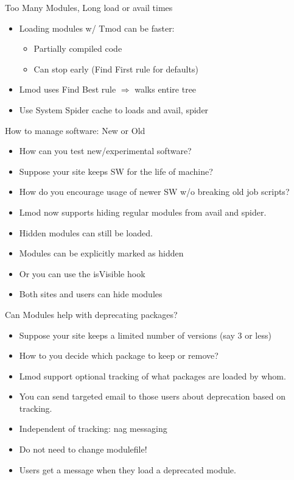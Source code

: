\documentclass{beamer}
\begin{document}
\begin{frame}{Too Many Modules, Long load or avail times}
  \begin{itemize}
    \item Loading modules w/ Tmod can be faster:
      \begin{itemize}
        \item Partially compiled code
        \item Can stop early (Find First rule for defaults)
      \end{itemize}
    \item Lmod uses Find Best rule $\Rightarrow$ walks entire tree
    \item Use System Spider cache to loads and avail, spider
  \end{itemize}
\end{frame}

\begin{frame}{How to manage software: New or Old}
  \begin{itemize}
    \item How can you test new/experimental software?
    \item Suppose your site keeps SW for the life of machine?
    \item How do you encourage usage of newer SW w/o breaking old job
      scripts?
    \item Lmod now supports hiding regular modules from avail and
      spider.
    \item Hidden modules can still be loaded.
    \item Modules can be explicitly marked as hidden
    \item Or you can use the isVisible hook
    \item Both sites and users can hide modules
  \end{itemize}
\end{frame}

\begin{frame}{Can Modules help with deprecating packages?}
  \begin{itemize}
    \item Suppose your site keeps a limited number of versions (say 3
      or less)
    \item How to you decide which package to keep or remove?
    \item Lmod support optional tracking of what packages are loaded
      by whom.
    \item You can send targeted email to those users about
      deprecation based on tracking.
    \item Independent of tracking: nag messaging
    \item Do not need to change modulefile!
    \item Users get a message when they load a deprecated module. 
  \end{itemize}
\end{frame}
\end{document}
